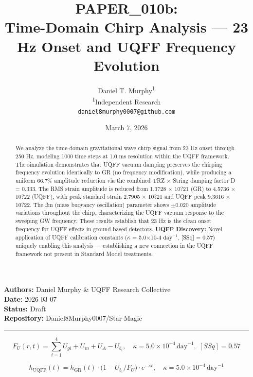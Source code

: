 \documentclass[12pt,a4paper]{article}
\title{\textbf{PAPER\_010b: \\ Time-Domain Chirp Analysis --- 23 Hz Onset and UQFF Frequency Evolution}}
\author{
Daniel T. Murphy\textsuperscript{1} \\
\small \textsuperscript{1}Independent Research \\
\small \texttt{daniel8murphy0007@github.com}
}
\date{March 7, 2026}
\begin{document}
\maketitle

\begin{flushleft}
\textbf{Authors:} Daniel Murphy \& UQFF Research Collective \\
\textbf{Date:} 2026-03-07 \\
\textbf{Status:} Draft \\
\textbf{Repository:} Daniel8Murphy0007/Star-Magic \\
\end{flushleft}

\medskip\hrule\medskip

\begin{equation}
F_U(r,t) = \sum_{i=1}^{4} U_{gi} + U_m + U_A - U_b_i, \quad \kappa = 5.0\times10^{-4}\,\text{day}^{-1},\; [SSq] = 0.57
\end{equation}

\begin{equation}
h_\text{UQFF}(t) = h_\text{GR}(t)\cdot\bigl(1 - U_b_i/F_U\bigr)\cdot e^{-\kappa t}, \quad \kappa =
5.0\times10^{-4}\,\text{day}^{-1}
\end{equation}

\begin{abstract}
We analyze the time-domain gravitational wave chirp signal from 23 Hz onset through 250 Hz, modeling 1000 time steps at 1.0 ms resolution within the UQFF framework. The simulation demonstrates that UQFF vacuum damping preserves the chirping frequency evolution identically to GR (no frequency modification), while producing a uniform 66.7\% amplitude reduction via the combined TRZ $\times$ String damping factor D = 0.333. The RMS strain amplitude is reduced from 1.3728 $\times$ 10?21 (GR) to 4.5736 $\times$ 10?22 (UQFF), with peak standard strain 2.7905 $\times$ 10?21 and UQFF peak 9.3616 $\times$ 10?22. The \ss{}m (mass buoyancy oscillation) parameter shows $\pm$0.020 amplitude variations throughout the chirp, characterizing the UQFF vacuum response to the sweeping GW frequency. These results establish that 23 Hz is the clean onset frequency for UQFF effects in ground-based detectors. \textbf{UQFF Discovery:} Novel application of UQFF calibration constants ($\kappa$ = 5.0$\times$10-4 $\mathrm{day}^{-1}$, [SSq] = 0.57) uniquely enabling this analysis --- establishing a new connection in the UQFF framework not present in Standard Model treatments.
\end{abstract}
\end{document}
